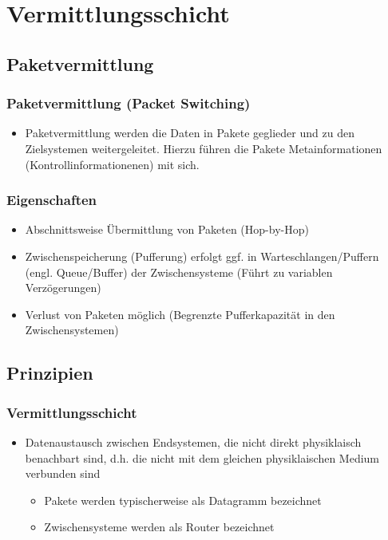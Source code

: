 \newpage
\section{Vermittlungsschicht}
  \subsection{Paketvermittlung}
    \subsubsection{Paketvermittlung (Packet Switching)}
      \begin{itemize}
        \item Paketvermittlung werden die Daten in Pakete geglieder und zu den Zielsystemen
          weitergeleitet. Hierzu führen die Pakete Metainformationen (Kontrollinformationenen) mit sich.
      \end{itemize} 
    \subsubsection{Eigenschaften}
      \begin{itemize}
        \item Abschnittsweise Übermittlung von Paketen (Hop-by-Hop)
        \item Zwischenspeicherung (Pufferung) erfolgt ggf. in Warteschlangen/Puffern
          (engl. Queue/Buffer) der Zwischensysteme (Führt zu variablen Verzögerungen)
        \item Verlust von Paketen möglich (Begrenzte Pufferkapazität in den Zwischensystemen)
      \end{itemize}
  \subsection{Prinzipien}
    \subsubsection{Vermittlungsschicht}
      \begin{itemize}
        \item Datenaustausch zwischen Endsystemen, die nicht direkt physiklaisch benachbart sind, d.h.
          die nicht mit dem gleichen physiklaischen Medium verbunden sind
          \begin{itemize}
            \item Pakete werden typischerweise als Datagramm bezeichnet
            \item Zwischensysteme werden als Router bezeichnet
          \end{itemize}
      \end{itemize}
